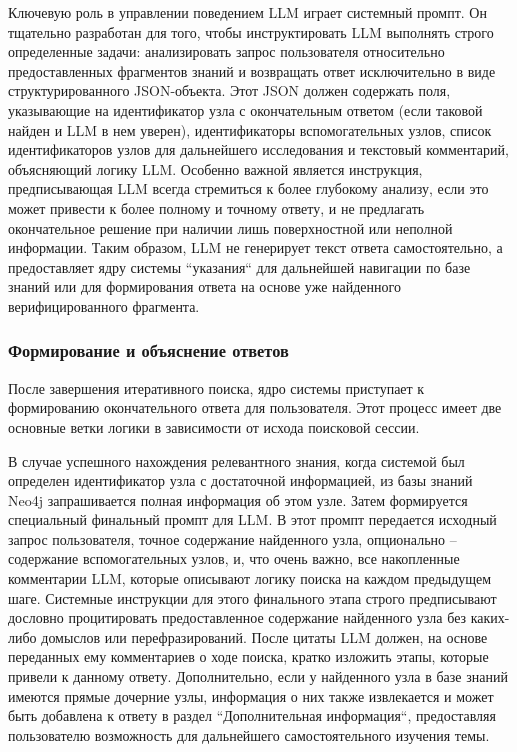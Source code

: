 Ключевую роль в управлении поведением LLM играет системный промпт. Он тщательно разработан для того, чтобы инструктировать LLM выполнять строго определенные задачи: анализировать запрос пользователя относительно предоставленных фрагментов знаний и возвращать ответ исключительно в виде структурированного JSON-объекта. Этот JSON должен содержать поля, указывающие на идентификатор узла с окончательным ответом (если таковой найден и LLM в нем уверен), идентификаторы вспомогательных узлов, список идентификаторов узлов для дальнейшего исследования и текстовый комментарий, объясняющий логику LLM. Особенно важной является инструкция, предписывающая LLM всегда стремиться к более глубокому анализу, если это может привести к более полному и точному ответу, и не предлагать окончательное решение при наличии лишь поверхностной или неполной информации. Таким образом, LLM не генерирует текст ответа самостоятельно, а предоставляет ядру системы ``указания`` для дальнейшей навигации по базе знаний или для формирования ответа на основе уже найденного верифицированного фрагмента.

\subsubsection{Формирование и объяснение ответов}

После завершения итеративного поиска, ядро системы приступает к формированию окончательного ответа для пользователя. Этот процесс имеет две основные ветки логики в зависимости от исхода поисковой сессии.

В случае успешного нахождения релевантного знания, когда системой был определен идентификатор узла с достаточной информацией, из базы знаний Neo4j запрашивается полная информация об этом узле. Затем формируется специальный финальный промпт для LLM. В этот промпт передается исходный запрос пользователя, точное содержание найденного узла, опционально – содержание вспомогательных узлов, и, что очень важно, все накопленные комментарии LLM, которые описывают логику поиска на каждом предыдущем шаге. Системные инструкции для этого финального этапа строго предписывают дословно процитировать предоставленное содержание найденного узла без каких-либо домыслов или перефразирований. После цитаты LLM должен, на основе переданных ему комментариев о ходе поиска, кратко изложить этапы, которые привели к данному ответу. Дополнительно, если у найденного узла в базе знаний имеются прямые дочерние узлы, информация о них также извлекается и может быть добавлена к ответу в раздел ``Дополнительная информация``, предоставляя пользователю возможность для дальнейшего самостоятельного изучения темы.

